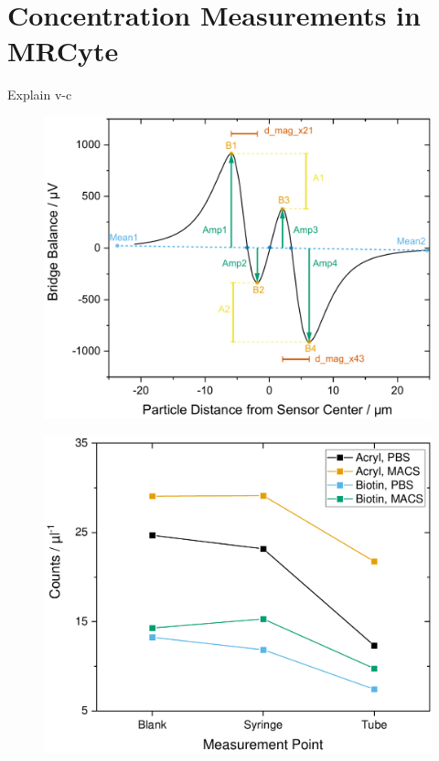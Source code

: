

\section{Concentration Measurements in MRCyte}
Explain v-c
\begin{figure}[htb!]
	\centering
	\includegraphics[width=.7\linewidth]{Ressources/Simulation/ExampleSignal}
	\label{fig:conc:example}
\end{figure}

\begin{figure}[htb!]
	\centering
	\includegraphics[width=.7\linewidth]{Ressources/Concentration/Losses-Syringe-Tubing}
	\label{fig:conc:losses_syringe}
\end{figure}



